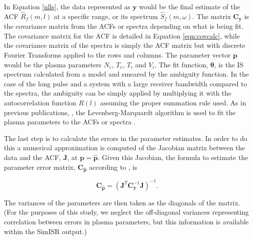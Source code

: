 \documentclass[draft,ras]{agutex}
\begin{document}
\begin{article}
In Equation \ref{nlls}, the data represented as $\mathbf{y}$ would be the final estimate of the ACF $\widehat{R}_f(m,l)$ at a specific range, or its spectrum $\widehat{S}_f(m,\omega)$. The matrix $\mathbf{C}_{\mathbf{y}}$  is the covariance matrix from the ACFs or spectra depending on what is being fit. The covariance matrix for the ACF is detailed in Equation \ref{eqn:covcalc}, while the covariance matrix of the spectra is simply the ACF matrix but with discrete Fourier Transforms applied to the rows and columns. The parameter vector $\mathbf{p}$ would be the plasma parameters $N_e$, $T_e$, $T_i$ and $V_i$. The fit function, $\bm{\theta}$, is the IS spectrum calculated from a model \citep[e.g.,][]{kudeki:milla:1} and smeared by the ambiguity function.  In the case of the long pulse and a system with a large receiver bandwidth compared to the spectra, the ambiguity can be simply applied by multiplying it with the autocorrelation function $R(l)$ assuming the proper summation rule used. As in previous publications, \citep[e.g.,][]{nikoukar2008}, the Levenberg-Marquardt algorithm is used to fit the plasma parameters to the ACFs or spectra \citep{levenberg1944,marquardt:1963}.

The last step is to calculate the errors in the parameter estimates. In order to do this a numerical approximation is computed of the Jacobian matrix between the data and the ACF, $\mathbf{J}$, at $\mathbf{p}=\mathbf{\hat{p}}$. Given this Jacobian, the formula to estimate the parameter error matrix, $\mathbf{C}_{\mathbf{\hat{p}}}$ according to \citet{Hysell:2000cq}, is


\begin{equation}
\label{eqn:jacinv}
\mathbf{C}_{\mathbf{\hat{p}}}=(\mathbf{J}^T \mathbf{C}_{\mathbf{y}}^{-1}\mathbf{J})^{-1}.
\end{equation}

\noindent  The variances of the parameters are then taken as the diagonals of the matrix.  (For the purposes of this study, we neglect the off-diagonal variances representing correlation between errors in plasma parameters, but this information is available within the SimISR output.)



\end{article}
\end{document}
